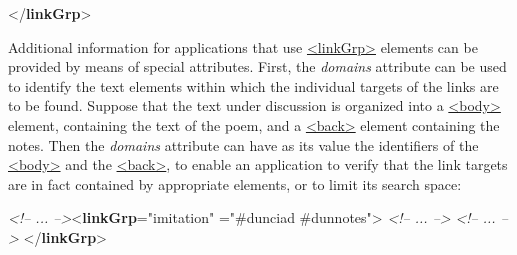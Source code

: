 \begin{shaded}
\mbox{}\newline 
{}\mbox{}\newline 
{}\mbox{}\newline 
{</\textbf{linkGrp}>}\end{shaded}\egroup\par \par
Additional information for applications that use \hyperref[TEI.linkGrp]{<linkGrp>} elements can be provided by means of special attributes. First, the {\itshape domains} attribute can be used to identify the text elements within which the individual targets of the links are to be found. Suppose that the text under discussion is organized into a \hyperref[TEI.body]{<body>} element, containing the text of the poem, and a \hyperref[TEI.back]{<back>} element containing the notes. Then the {\itshape domains} attribute can have as its value the identifiers of the \hyperref[TEI.body]{<body>} and the \hyperref[TEI.back]{<back>}, to enable an application to verify that the link targets are in fact contained by appropriate elements, or to limit its search space: \par\bgroup{}\exampleFont \begin{shaded}\noindent\mbox{}\mbox{}\newline 
\textit{<!-- ... -->}{<\textbf{linkGrp}\hspace*{1em}{type}="{imitation}"\mbox{}\newline 
\hspace*{1em}{domains}="{\#dunciad \#dunnotes}">}\mbox{}\newline 
{}\mbox{}\newline 
{}\mbox{}\newline 
\textit{<!-- ... -->}\mbox{}\newline 
{}\mbox{}\newline 
\textit{<!-- ... -->}\mbox{}\newline 
{</\textbf{linkGrp}>}\end{shaded}\egroup\par \par

